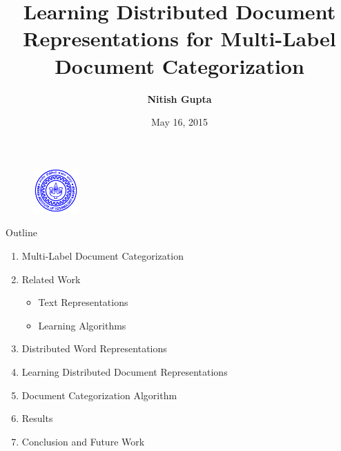 \documentclass[10pt]{beamer}
\title[{Distributed Document Representations for Multi-Label Document Categorization}]{Learning Distributed Document Representations for Multi-Label Document Categorization}
\author{\textbf{Nitish Gupta}\vspace{-2mm}  }
\date{May 16, 2015}
\institute[IITK]{ %
\scriptsize{Supervisor : Prof. Harish Karnick} \\ 
\scriptsize{Co-Supervisor : Prof. Rajesh M. Hegde} \\ 
\vspace{2mm} 
B.Tech - M.Tech Dual Degree\\
\vspace{.2cm}Thesis Defense\\ 
\vspace{.2cm}Electrical Engineering\\
\vspace{.2cm}IIT Kanpur }
\begin{document}
\begin{frame}
\titlepage
\vspace{-2mm}
\begin{figure}[ht]
\begin{center}
\includegraphics[width=1.75cm]{iitk_logo-eps-converted-to.pdf}
\end{center}
\end{figure}
\end{frame}

\begin{frame}{Outline}
\begin{enumerate}
	\vfill\item Multi-Label Document Categorization
	\vfill\item Related Work
	\begin{itemize}
	  \vfill\item Text Representations
	  \vfill\item Learning Algorithms
	\end{itemize}  
	\vfill\item Distributed Word Representations
	\vfill\item Learning Distributed Document Representations
	\vfill\item Document Categorization Algorithm
	\vfill\item Results
	\vfill\item Conclusion and Future Work
\end{enumerate}
\end{frame}
\end{document}
